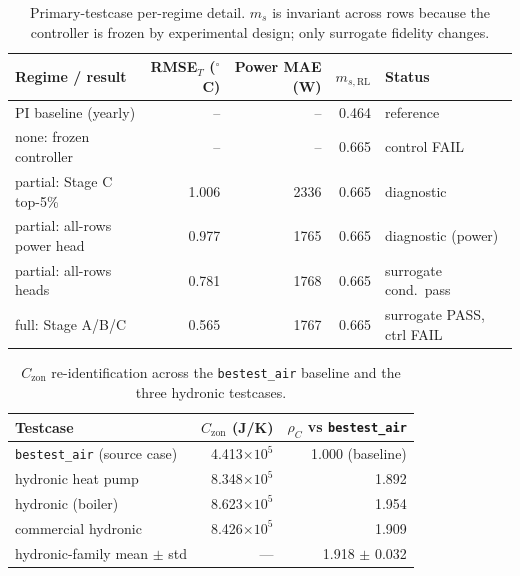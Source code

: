 \documentclass[11pt,a4paper]{article}
\begin{document}
\begin{table}[H]
\centering
\small
\caption{Primary-testcase per-regime detail. $m_s$ is invariant across rows because the controller is frozen by experimental design; only surrogate fidelity changes.}
\label{tab:primary}
\begin{tabularx}{\linewidth}{>{\raggedright\arraybackslash}p{42mm}rrr>{\raggedright\arraybackslash}X}
\toprule
Regime / result & RMSE$_T$ ($^\circ$C) & Power MAE (W) & $m_{s,\mathrm{RL}}$ & Status \\
\midrule
PI baseline (yearly) & -- & -- & 0.464 & reference \\
none: frozen controller & -- & -- & 0.665 & control FAIL \\
partial: Stage C top-5\% & 1.006 & 2336 & 0.665 & diagnostic \\
partial: all-rows power head & 0.977 & 1765 & 0.665 & diagnostic (power) \\
partial: all-rows heads & 0.781 & 1768 & 0.665 & surrogate cond.\ pass \\
full: Stage A/B/C & 0.565 & 1767 & 0.665 & surrogate PASS, ctrl FAIL \\
\bottomrule
\end{tabularx}
\end{table}
\begin{table}[H]
\centering
\small
\caption{$C_{\mathrm{zon}}$ re-identification across the \texttt{bestest\_air} baseline and the three hydronic testcases.}
\label{tab:czon}
\begin{tabular}{lrr}
\toprule
Testcase & $C_{\mathrm{zon}}$ (J/K) & $\rho_C$ vs \texttt{bestest\_air} \\
\midrule
\texttt{bestest\_air} (source case) & 4.413$\times10^5$ & 1.000 (baseline) \\
hydronic heat pump & 8.348$\times10^5$ & 1.892 \\
hydronic (boiler) & 8.623$\times10^5$ & 1.954 \\
commercial hydronic & 8.426$\times10^5$ & 1.909 \\
\midrule
hydronic-family mean $\pm$ std & --- & 1.918 $\pm$ 0.032 \\
\bottomrule
\end{tabular}
\end{table}
\end{document}
